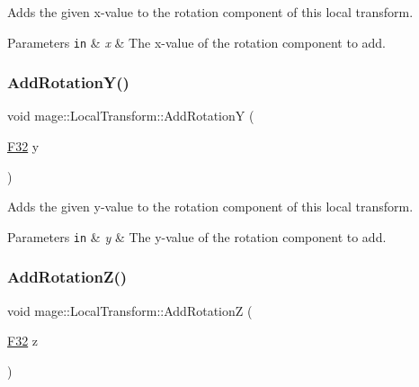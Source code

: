 Adds the given x-\/value to the rotation component of this local transform.


\begin{DoxyParams}[1]{Parameters}
\mbox{\tt in}  & {\em x} & The x-\/value of the rotation component to add. \\
\hline
\end{DoxyParams}
\hypertarget{classmage_1_1_local_transform_adea3848a1d4d83a836d33668f323bb4d}{}\label{classmage_1_1_local_transform_adea3848a1d4d83a836d33668f323bb4d} 
\subsubsection{\texorpdfstring{Add\+Rotation\+Y()}{AddRotationY()}}
{\footnotesize\ttfamily void mage\+::\+Local\+Transform\+::\+Add\+RotationY (\begin{DoxyParamCaption}\item[{\hyperlink{namespacemage_aa97e833b45f06d60a0a9c4fc22ae02c0}{F32}}]{y }\end{DoxyParamCaption})\hspace{0.3cm}{\ttfamily [noexcept]}}

Adds the given y-\/value to the rotation component of this local transform.


\begin{DoxyParams}[1]{Parameters}
\mbox{\tt in}  & {\em y} & The y-\/value of the rotation component to add. \\
\hline
\end{DoxyParams}
\hypertarget{classmage_1_1_local_transform_ac769e25872e8a738bd6189f2ca6db4ea}{}\label{classmage_1_1_local_transform_ac769e25872e8a738bd6189f2ca6db4ea} 
\subsubsection{\texorpdfstring{Add\+Rotation\+Z()}{AddRotationZ()}}
{\footnotesize\ttfamily void mage\+::\+Local\+Transform\+::\+Add\+RotationZ (\begin{DoxyParamCaption}\item[{\hyperlink{namespacemage_aa97e833b45f06d60a0a9c4fc22ae02c0}{F32}}]{z }\end{DoxyParamCaption})\hspace{0.3cm}{\ttfamily [noexcept]}}

